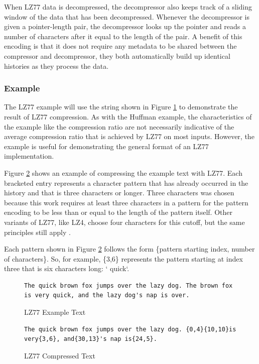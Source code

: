 \documentclass[doublespace,nopageskip]{VTthesis}
\begin{document}
When LZ77 data is decompressed, the decompressor also keeps track of a sliding window of the data that has been decompressed. Whenever the decompressor is given a pointer-length pair, the decompressor looks up the pointer and reads a number of characters after it equal to the length of the pair. A benefit of this encoding is that it does not require any metadata to be shared between the compressor and decompressor, they both automatically build up identical histories as they process the data.

\subsubsection{Example}\label{sss:lz77_example}
The LZ77 example will use the string shown in Figure \ref{fig:lz77_example_text} to demonstrate the result of LZ77 compression. As with the Huffman example, the characteristics of the example like the compression ratio are not necessarily indicative of the average compression ratio that is achieved by LZ77 on most inputs. However, the example is useful for demonstrating the general format of an LZ77 implementation.

Figure \ref{fig:lz77_compressed_text} shows an example of compressing the example text with LZ77. Each bracketed entry represents a character pattern that has already occurred in the history and that is three characters or longer. Three characters was chosen because this work requires at least three characters in a pattern for the pattern encoding to be less than or equal to the length of the pattern itself. Other variants of LZ77, like LZ4, choose four characters for this cutoff, but the same principles still apply \cite{lz4}.

Each pattern shown in Figure \ref{fig:lz77_compressed_text} follows the form \{pattern starting index, number of characters\}. So, for example, \{3,6\} represents the pattern starting at index three that is six characters long: ` quick`.

\begin{figure}[htb]
	\centering
    \begin{lstlisting}
The quick brown fox jumps over the lazy dog. The brown fox is very quick, and the lazy dog's nap is over.
    \end{lstlisting}
	\caption{LZ77 Example Text}
	\label{fig:lz77_example_text}
\end{figure}

\begin{figure}[htb]
	\centering
    \begin{lstlisting}
The quick brown fox jumps over the lazy dog. {0,4}{10,10}is very{3,6}, and{30,13}'s nap is{24,5}.
    \end{lstlisting}
	\caption{LZ77 Compressed Text}
	\label{fig:lz77_compressed_text}
\end{figure}
\end{document}
